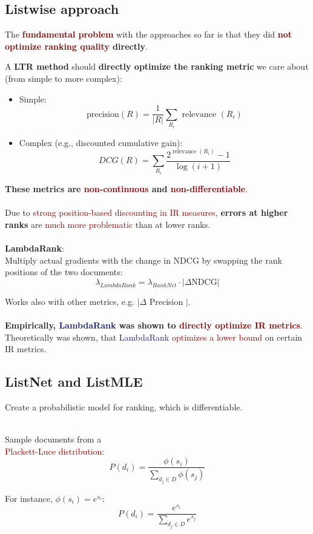\subsection{Listwise approach}
The \textbf{\textcolor{Maroon}{fundamental problem}} with the approaches so far is that they did \textbf{\textcolor{Maroon}{not optimize ranking quality} directly}.

A \textbf{LTR method} should \textbf{directly optimize the ranking metric} we care about (from simple to more complex):
\begin{itemize}
\setlength\itemsep{0em}
    \item Simple: \\
    $$ \text{precision}(R) = \frac{1}{|R|} \sum_{R_{i}} \text { relevance }\left(R_{i}\right) $$
    \item Complex (e.g., discounted cumulative gain): \\
    $$
D C G(R)=\sum_{R_{i}} \frac{2^{\operatorname{relevance}\left(R_{i}\right)}-1}{\log (i+1)}
$$
\end{itemize}

\textbf{These metrics are \textcolor{Maroon}{non-continuous} and \textcolor{Maroon}{non-differentiable}}. \\
\\
Due to \textcolor{Maroon}{strong position-based discounting in IR measures}, \textbf{errors at higher ranks} are \textcolor{Maroon}{much more problematic} than at lower ranks. \\
\\
{\Large \textbf{\textcolor{NavyBlue}{LambdaRank}}}: \\
Multiply actual gradients with the change in NDCG by swapping the rank positions of the two documents:
$$ \lambda_{L a m b d a R a n k}=\lambda_{R a n k N e t} \cdot|\Delta \mathrm{NDCG}| $$

Works also with other metrics, e.g. $\mid \Delta$ Precision $\mid $.\\
\\
\textbf{Empirically, \textcolor{MidnightBlue}{LambdaRank} was shown to \textcolor{Maroon}{directly optimize IR metrics}}. Theoretically was shown, that \textcolor{MidnightBlue}{LambdaRank} \textcolor{Maroon}{optimizes a lower bound} on certain IR metrics.

\newpage

\subsection{ListNet and ListMLE}
Create a probabilistic model for ranking, which is differentiable. \\
\\
\begin{minipage}{0.6\textwidth}
Sample documents from a \\ \textcolor{Maroon}{Plackett-Luce distribution}:
$$ P\left(d_{i}\right)=\frac{\phi\left(s_{i}\right)}{\sum_{d_{j} \in D} \phi\left(s_{j}\right)} $$ 
\end{minipage}
\begin{minipage}{0.4\textwidth}
For instance, $\phi(s_i) = e^{s_{i}}$:
$$ P(d_i) = \frac{e^{s_{i}}}{\sum_{d_{j} \in D} e^{s_{j}}} $$ 
\end{minipage}

